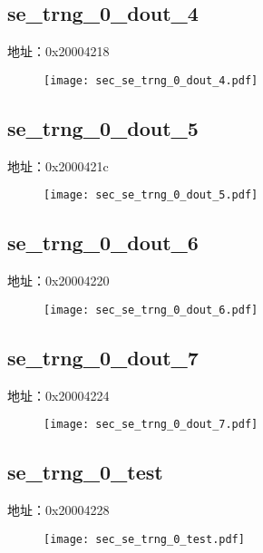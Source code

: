 \subsection{se\_trng\_0\_dout\_4}
\label{sec-se-trng-0-dout-4}
地址：0x20004218
 \begin{figure}[H]
\texttt{[image: sec\_se\_trng\_0\_dout\_4.pdf]}
\end{figure}

\subsection{se\_trng\_0\_dout\_5}
\label{sec-se-trng-0-dout-5}
地址：0x2000421c
 \begin{figure}[H]
\texttt{[image: sec\_se\_trng\_0\_dout\_5.pdf]}
\end{figure}

\subsection{se\_trng\_0\_dout\_6}
\label{sec-se-trng-0-dout-6}
地址：0x20004220
 \begin{figure}[H]
\texttt{[image: sec\_se\_trng\_0\_dout\_6.pdf]}
\end{figure}

\subsection{se\_trng\_0\_dout\_7}
\label{sec-se-trng-0-dout-7}
地址：0x20004224
 \begin{figure}[H]
\texttt{[image: sec\_se\_trng\_0\_dout\_7.pdf]}
\end{figure}

\subsection{se\_trng\_0\_test}
\label{sec-se-trng-0-test}
地址：0x20004228
 \begin{figure}[H]
\texttt{[image: sec\_se\_trng\_0\_test.pdf]}
\end{figure}

